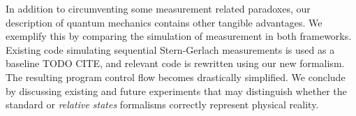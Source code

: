 In addition to circumventing some measurement related paradoxes, our description of quantum
mechanics contains other tangible advantages. We exemplify this by comparing the simulation of measurement in  both frameworks. Existing code simulating sequential Stern-Gerlach measurements is used as a baseline TODO CITE, and relevant code is rewritten using our new formalism. The resulting program control flow becomes drastically simplified. We conclude by discussing existing and future experiments that may distinguish whether the standard or \textit{relative states} formalisms correctly represent physical reality.
%
%


